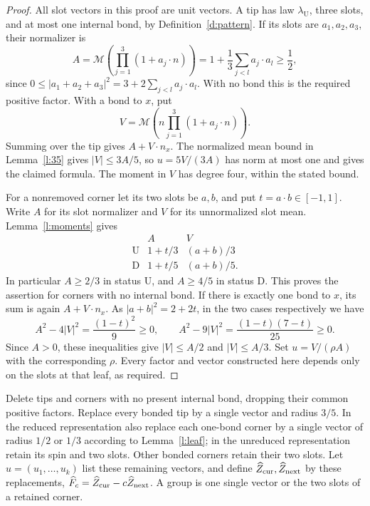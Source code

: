 \begin{proof}
All slot vectors in this proof are unit vectors.  A tip has law
\(\lambda_{\mathrm U}\), three slots, and at most one internal
bond, by Definition~\ref{d:pattern}.  If its slots are
\(a_1,a_2,a_3\), their normalizer is
\[
 A=\mathcal M\left(\prod_{j=1}^3(1+a_j\cdot n)\right)
   =1+\frac13\sum_{j<l}a_j\cdot a_l\ge\frac12,
\]
since \(0\le|a_1+a_2+a_3|^2=3+2\sum_{j<l}a_j\cdot a_l\).
With no bond this is the required positive factor.  With a bond
to \(x\), put
\[
 V=\mathcal M\left(n\prod_{j=1}^3(1+a_j\cdot n)\right).
\]
Summing over the tip gives \(A+V\cdot n_x\).  The normalized
mean bound in Lemma~\ref{l:35} gives \(|V|\le3A/5\), so
\(u=5V/(3A)\) has norm at most one and gives the claimed formula.
The moment in \(V\) has degree four, within the stated bound.

For a nonremoved corner let its two slots be \(a,b\), and put
\(t=a\cdot b\in[-1,1]\).  Write \(A\) for its slot normalizer
and \(V\) for its unnormalized slot mean.  Lemma~\ref{l:moments}
gives
\[
 \begin{array}{c|cc}
   &A&V\\ \hline
  \mathrm U&1+t/3&(a+b)/3\\
  \mathrm D&1+t/5&(a+b)/5 .
 \end{array}
\]
In particular \(A\ge2/3\) in status \(\mathrm U\), and
\(A\ge4/5\) in status \(\mathrm D\).  This proves the assertion
for corners with no internal bond.  If there is exactly one bond
to \(x\), its sum is again \(A+V\cdot n_x\).  As
\(|a+b|^2=2+2t\), in the two cases respectively we have
\[
 A^2-4|V|^2=\frac{(1-t)^2}{9}\ge0,
 \qquad
 A^2-9|V|^2=\frac{(1-t)(7-t)}{25}\ge0.
\]
Since \(A>0\), these inequalities give \(|V|\le A/2\) and
\(|V|\le A/3\).  Set \(u=V/(\rho A)\) with the corresponding
\(\rho\).  Every factor and vector constructed here depends only
on the slots at that leaf, as required.
\end{proof}

\begin{definition}\label{d:reduction}
Delete tips and corners with no present internal bond, dropping
their common positive factors. Replace every bonded tip by a
single vector and radius \(3/5\).
In the reduced representation also replace each one-bond corner
by a single vector of radius \(1/2\) or \(1/3\) according to
Lemma~\ref{l:leaf}; in the unreduced representation retain its spin
and two slots. Other bonded corners retain their two slots.
Let \(u=(u_1,\ldots,u_k)\) list these remaining vectors, and define
\(\widehat Z_{\rm cur},\widehat Z_{\rm next}\) by these replacements,
\(\widehat F_c=\widehat Z_{\rm cur}-c\widehat Z_{\rm next}\).
A group is one single vector or the two slots of a retained corner.
\end{definition}

